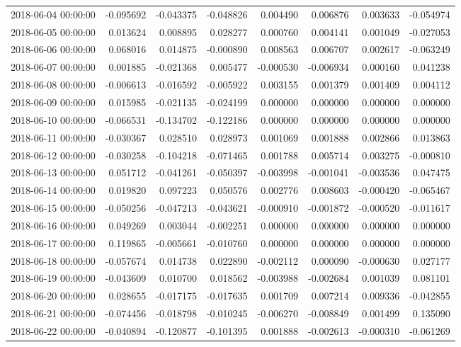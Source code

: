\begin{tabular}{lrrrrrrr}
2018-06-04 00:00:00 & -0.095692 & -0.043375 & -0.048826 & 0.004490 & 0.006876 & 0.003633 & -0.054974 \\
2018-06-05 00:00:00 & 0.013624 & 0.008895 & 0.028277 & 0.000760 & 0.004141 & 0.001049 & -0.027053 \\
2018-06-06 00:00:00 & 0.068016 & 0.014875 & -0.000890 & 0.008563 & 0.006707 & 0.002617 & -0.063249 \\
2018-06-07 00:00:00 & 0.001885 & -0.021368 & 0.005477 & -0.000530 & -0.006934 & 0.000160 & 0.041238 \\
2018-06-08 00:00:00 & -0.006613 & -0.016592 & -0.005922 & 0.003155 & 0.001379 & 0.001409 & 0.004112 \\
2018-06-09 00:00:00 & 0.015985 & -0.021135 & -0.024199 & 0.000000 & 0.000000 & 0.000000 & 0.000000 \\
2018-06-10 00:00:00 & -0.066531 & -0.134702 & -0.122186 & 0.000000 & 0.000000 & 0.000000 & 0.000000 \\
2018-06-11 00:00:00 & -0.030367 & 0.028510 & 0.028973 & 0.001069 & 0.001888 & 0.002866 & 0.013863 \\
2018-06-12 00:00:00 & -0.030258 & -0.104218 & -0.071465 & 0.001788 & 0.005714 & 0.003275 & -0.000810 \\
2018-06-13 00:00:00 & 0.051712 & -0.041261 & -0.050397 & -0.003998 & -0.001041 & -0.003536 & 0.047475 \\
2018-06-14 00:00:00 & 0.019820 & 0.097223 & 0.050576 & 0.002776 & 0.008603 & -0.000420 & -0.065467 \\
2018-06-15 00:00:00 & -0.050256 & -0.047213 & -0.043621 & -0.000910 & -0.001872 & -0.000520 & -0.011617 \\
2018-06-16 00:00:00 & 0.049269 & 0.003044 & -0.002251 & 0.000000 & 0.000000 & 0.000000 & 0.000000 \\
2018-06-17 00:00:00 & 0.119865 & -0.005661 & -0.010760 & 0.000000 & 0.000000 & 0.000000 & 0.000000 \\
2018-06-18 00:00:00 & -0.057674 & 0.014738 & 0.022890 & -0.002112 & 0.000090 & -0.000630 & 0.027177 \\
2018-06-19 00:00:00 & -0.043609 & 0.010700 & 0.018562 & -0.003988 & -0.002684 & 0.001039 & 0.081101 \\
2018-06-20 00:00:00 & 0.028655 & -0.017175 & -0.017635 & 0.001709 & 0.007214 & 0.009336 & -0.042855 \\
2018-06-21 00:00:00 & -0.074456 & -0.018798 & -0.010245 & -0.006270 & -0.008849 & 0.001499 & 0.135090 \\
2018-06-22 00:00:00 & -0.040894 & -0.120877 & -0.101395 & 0.001888 & -0.002613 & -0.000310 & -0.061269 \\

\end{tabular}
